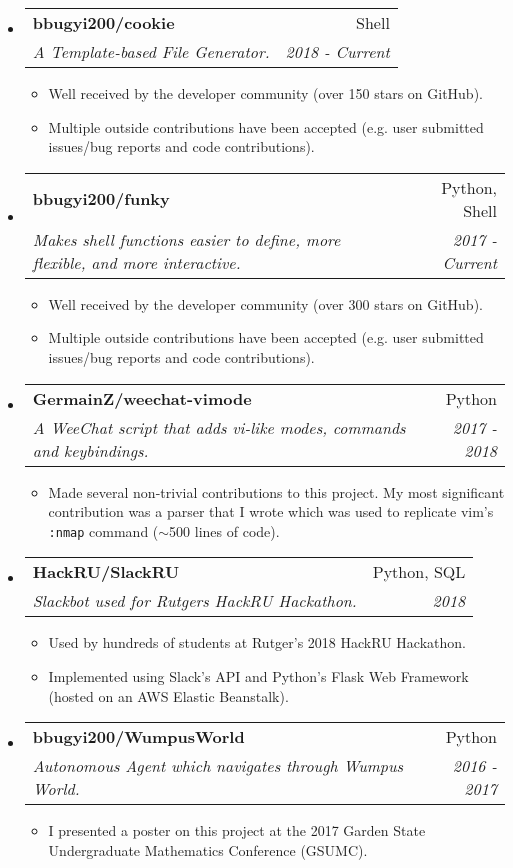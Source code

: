 \documentclass[letterpaper,11pt]{article}
\makeatletter
\newcommand{\ressubheading}[4]{
\begin{tabular*}{6.5in}{l@{\cftdotfill{\cftsecdotsep}\extracolsep{\fill}}r}
		\textbf{#1} & #2 \\
		\textit{#3} & \textit{#4} \\
\end{tabular*}\vspace{-6pt}}
\makeatother
\begin{document}
\begin{itemize}
\item \ressubheading{bbugyi200/cookie}{Shell}{A Template-based File Generator.}{2018 - Current}
    \begin{itemize}
        \item
            Well received by the developer community (over 150 stars on GitHub).
        \item
            Multiple outside contributions have been accepted (e.g. user submitted issues/bug reports and code contributions).
    \end{itemize}
\item \ressubheading{bbugyi200/funky}{Python, Shell}{Makes shell functions easier to define, more flexible, and more interactive.}{2017 - Current}
    \begin{itemize}
        \item
            Well received by the developer community (over 300 stars on GitHub).
        \item
            Multiple outside contributions have been accepted (e.g. user submitted issues/bug reports and code contributions).
    \end{itemize}
\item \ressubheading{GermainZ/weechat-vimode}{Python}{A WeeChat script that adds vi-like modes, commands and keybindings.}{2017 - 2018}
    \begin{itemize}
        \item
            Made several non-trivial contributions to this project. My most significant contribution was a parser that I wrote which was used to replicate vim's \texttt{:nmap} command ($\sim$500 lines of code).
    \end{itemize}
\item \ressubheading{HackRU/SlackRU}{Python, SQL}{Slackbot used for Rutgers HackRU Hackathon.}{2018}
    \begin{itemize}
        \item
            Used by hundreds of students at Rutger's 2018 HackRU Hackathon.
        \item
            Implemented using Slack's API and Python's Flask Web Framework (hosted on an AWS Elastic Beanstalk).
    \end{itemize}
\item \ressubheading{bbugyi200/WumpusWorld}{Python}{Autonomous Agent which navigates through Wumpus World.}{2016 - 2017}
    \begin{itemize}
        \item
            I presented a poster on this project at the 2017 Garden State Undergraduate Mathematics Conference (GSUMC).
    \end{itemize}
\end{itemize}
\end{document}
